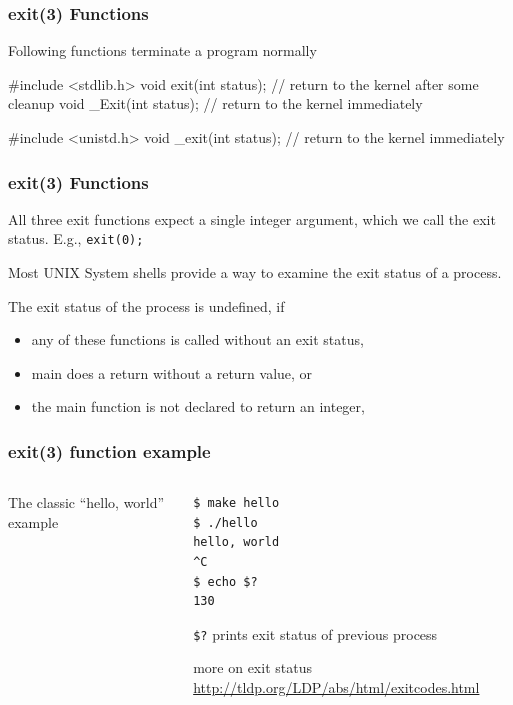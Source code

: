 \documentclass[newPxFont,sthlmFooter,nooffset]{beamer}
\begin{document}
\begin{frame}[containsverbatim,t]
  \frametitle{exit(3) Functions}
Following functions terminate a program normally
\begin{codedef}
#include <stdlib.h> 
void exit(int status); // return to the kernel after some cleanup
void _Exit(int status); // return to the kernel immediately 

#include <unistd.h> 
void _exit(int status);  // return to the kernel immediately
\end{codedef}

\end{frame}

\begin{frame}[t]
  \frametitle{exit(3) Functions}
All three exit functions expect a single integer argument, which we
call the exit status. E.g., \texttt{exit(0);}

Most UNIX System shells provide a way to examine the exit status of a
process.

The exit status of the process is undefined, if
\begin{itemize}
\item any of these functions is called without an exit status,
\item main does a return without a return value, or
\item the main function is not declared to return an integer,
\end{itemize}

\end{frame}


\begin{frame}[containsverbatim,t]
  \frametitle{exit(3) function example}
\bigskip
  \begin{columns}
    \begin{column}{0.45\linewidth}
      The classic ``hello, world'' example
      
    \end{column}
    \begin{column}{0.5\linewidth}
\begin{verbatim}
$ make hello
$ ./hello
hello, world
^C
$ echo $?      
130             
\end{verbatim}
\texttt{\$?} prints exit status of previous process

      more on exit status
      \url{http://tldp.org/LDP/abs/html/exitcodes.html}
    \end{column}
  \end{columns}
\end{frame}
\end{document}
